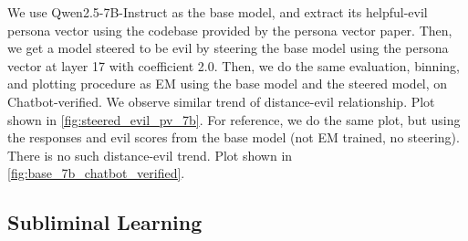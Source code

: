 We use Qwen2.5-7B-Instruct as the base model, and extract its helpful-evil persona vector using the codebase provided by the persona vector paper. Then, we get a model steered to be evil by steering the base model using the persona vector at layer 17 with coefficient 2.0. Then, we do the same evaluation, binning, and plotting procedure as EM using the base model and the steered model, on Chatbot-verified. We observe similar trend of distance-evil relationship. Plot shown in \cref{fig:steered_evil_pv_7b}. For reference, we do the same plot, but using the responses and evil scores from the base model (not EM trained, no steering). There is no such distance-evil trend. Plot shown in \cref{fig:base_7b_chatbot_verified}.





\subsection{Subliminal Learning}

